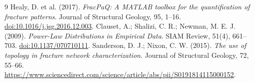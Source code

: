 \begin{thebibliography}{9}
 Healy, D. et al. (2017). \emph{FracPaQ: A MATLAB toolbox for the quantification of fracture patterns}. Journal of Structural Geology, 95, 1--16. \href{https://doi.org/10.1016/j.jsg.2016.12.003}{doi:10.1016/j.jsg.2016.12.003}.
 Clauset, A.; Shalizi, C. R.; Newman, M. E. J. (2009). \emph{Power-Law Distributions in Empirical Data}. SIAM Review, 51(4), 661--703. \href{https://doi.org/10.1137/070710111}{doi:10.1137/070710111}.
 Sanderson, D. J.; Nixon, C. W. (2015). \emph{The use of topology in fracture network characterization}. Journal of Structural Geology, 72, 55--66. \url{https://www.sciencedirect.com/science/article/abs/pii/S0191814115000152}.
\end{thebibliography}

